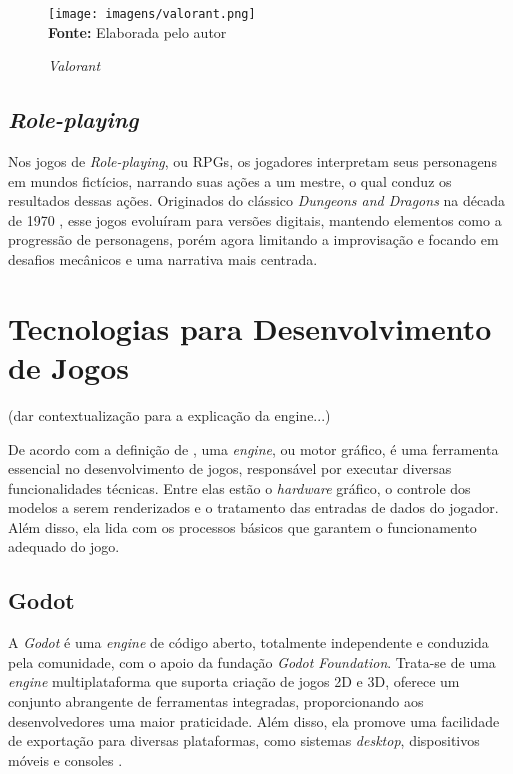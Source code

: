 \FloatBarrier 
\begin{figure}[!htbp]
	\centering
	\caption{\textit{Valorant}}
	\texttt{[image: imagens/valorant.png]}
	\\\textbf{Fonte:} Elaborada pelo autor
	
	\label{fig:vava}
\end{figure}
\FloatBarrier


\subsection{\textit{Role-playing}}

Nos jogos de \textit{Role-playing}, ou RPGs, os jogadores interpretam seus personagens em mundos fictícios, narrando suas ações a um mestre, o qual conduz os resultados dessas ações. Originados do clássico  \textit{Dungeons and Dragons} na década de 1970 \cite{Mason2004}, esse jogos evoluíram para versões digitais, mantendo elementos como a progressão de personagens, porém agora limitando a improvisação e focando em desafios mecânicos e uma narrativa mais centrada.

\section{Tecnologias para Desenvolvimento de Jogos} 

(dar contextualização para a explicação da engine...)

De acordo com a definição de , uma \textit{engine}, ou motor gráfico, é uma ferramenta essencial no desenvolvimento de jogos, responsável por executar diversas funcionalidades técnicas. Entre elas estão o \textit{hardware} gráfico, o controle dos modelos a serem renderizados e o tratamento das entradas de dados do jogador. Além disso, ela lida com os processos básicos que garantem o funcionamento adequado do jogo. 

\subsection{Godot}

A \textit{Godot} é uma \textit{engine} de código aberto, totalmente independente e conduzida pela comunidade, com o apoio da fundação \textit{Godot Foundation}. Trata-se de uma \textit{engine} multiplataforma que suporta criação de jogos 2D e 3D, oferece um conjunto abrangente de ferramentas integradas, proporcionando aos desenvolvedores uma maior praticidade. Além disso, ela promove uma facilidade de exportação para diversas plataformas, como sistemas \textit{desktop}, dispositivos móveis e consoles  \cite{GodotDocs2024}.

